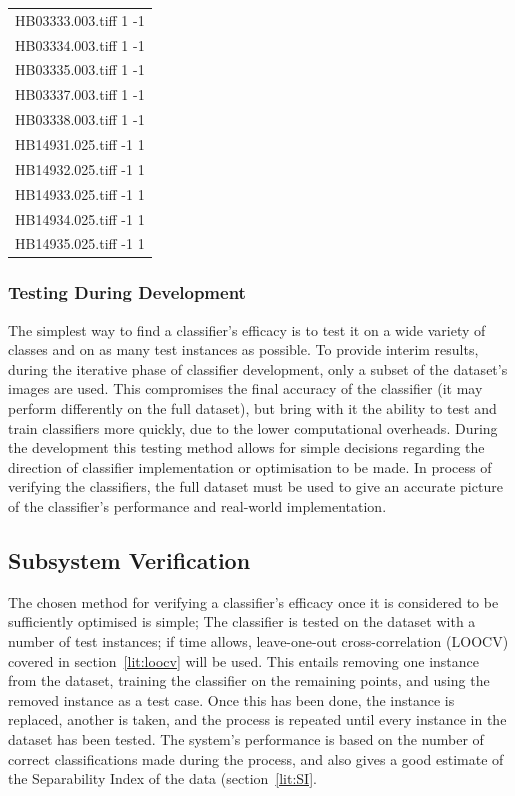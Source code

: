 \begin{center}
\begin{tabular}{c}
HB03333.003.tiff 1 -1 \\
HB03334.003.tiff 1 -1 \\
HB03335.003.tiff 1 -1 \\
HB03337.003.tiff 1 -1 \\
HB03338.003.tiff 1 -1 \\
HB14931.025.tiff -1 1 \\
HB14932.025.tiff -1 1 \\
HB14933.025.tiff -1 1 \\
HB14934.025.tiff -1 1 \\
HB14935.025.tiff -1 1 \\


\end{tabular}
\end{center}

\subsubsection{Testing During Development}
The simplest way to find a classifier's efficacy is to test it on a wide variety of classes and on as many test instances as possible. To provide interim results, during the iterative phase of classifier development, only a subset of the dataset's images are used. This compromises the final accuracy of the classifier (it may perform differently on the full dataset), but bring with it the ability to test and train classifiers more quickly, due to the lower computational overheads. During the development this testing method allows for simple decisions regarding the direction of classifier implementation or optimisation to be made. In process of verifying the classifiers, the full dataset must be used to give an accurate picture of the classifier's performance and real-world implementation. 

\subsection{Subsystem Verification}
The chosen method for verifying a classifier's efficacy once it is considered to be sufficiently optimised is simple; The classifier is tested on the dataset with a number of test instances; if time allows, leave-one-out cross-correlation (LOOCV) covered in section~\ref{lit:loocv} will be used. This entails removing one instance from the dataset, training the classifier on the remaining points, and using the removed instance as a test case. Once this has been done, the instance is replaced, another is taken, and the process is repeated until every instance in the dataset has been tested. The system's performance is based on the number of correct classifications made during the process, and also gives a good estimate of the Separability Index of the data (section~\ref{lit:SI}. 
